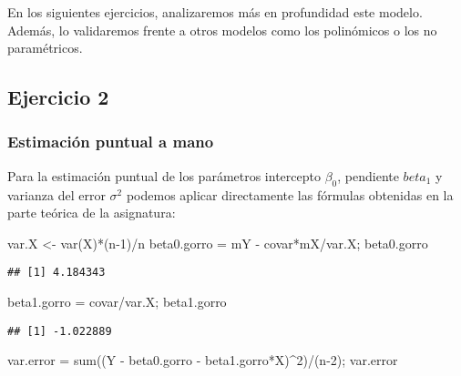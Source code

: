 \documentclass[
]{article}
\newenvironment{Shaded}{\begin{snugshade}}{\end{snugshade}}
\newcommand{\DecValTok}[1]{\textcolor[rgb]{0.00,0.00,0.81}{#1}}
\newcommand{\FunctionTok}[1]{\textcolor[rgb]{0.00,0.00,0.00}{#1}}
\newcommand{\NormalTok}[1]{#1}
\newcommand{\OtherTok}[1]{\textcolor[rgb]{0.56,0.35,0.01}{#1}}
\newcommand{\SpecialCharTok}[1]{\textcolor[rgb]{0.00,0.00,0.00}{#1}}
\begin{document}
En los siguientes ejercicios, analizaremos más en profundidad este
modelo. Además, lo validaremos frente a otros modelos como los
polinómicos o los no paramétricos.

\hypertarget{ejercicio-2}{%
\subsection{Ejercicio 2}\label{ejercicio-2}}

\hypertarget{estimaciuxf3n-puntual-a-mano}{%
\subsubsection{Estimación puntual a
mano}\label{estimaciuxf3n-puntual-a-mano}}

Para la estimación puntual de los parámetros intercepto \(\beta_0\),
pendiente \(beta_1\) y varianza del error \(\sigma^2\) podemos aplicar
directamente las fórmulas obtenidas en la parte teórica de la
asignatura:

\begin{Shaded}
\begin{Highlighting}[]
\NormalTok{var.X }\OtherTok{\textless{}{-}} \FunctionTok{var}\NormalTok{(X)}\SpecialCharTok{*}\NormalTok{(n}\DecValTok{{-}1}\NormalTok{)}\SpecialCharTok{/}\NormalTok{n}
\NormalTok{beta0.gorro }\OtherTok{=}\NormalTok{ mY }\SpecialCharTok{{-}}\NormalTok{ covar}\SpecialCharTok{*}\NormalTok{mX}\SpecialCharTok{/}\NormalTok{var.X; beta0.gorro}
\end{Highlighting}
\end{Shaded}

\begin{verbatim}
## [1] 4.184343
\end{verbatim}

\begin{Shaded}
\begin{Highlighting}[]
\NormalTok{beta1.gorro }\OtherTok{=}\NormalTok{ covar}\SpecialCharTok{/}\NormalTok{var.X; beta1.gorro}
\end{Highlighting}
\end{Shaded}

\begin{verbatim}
## [1] -1.022889
\end{verbatim}

\begin{Shaded}
\begin{Highlighting}[]
\NormalTok{var.error }\OtherTok{=} \FunctionTok{sum}\NormalTok{((Y }\SpecialCharTok{{-}}\NormalTok{ beta0.gorro }\SpecialCharTok{{-}}\NormalTok{ beta1.gorro}\SpecialCharTok{*}\NormalTok{X)}\SpecialCharTok{\^{}}\DecValTok{2}\NormalTok{)}\SpecialCharTok{/}\NormalTok{(n}\DecValTok{{-}2}\NormalTok{); var.error}
\end{Highlighting}
\end{Shaded}
\end{document}
